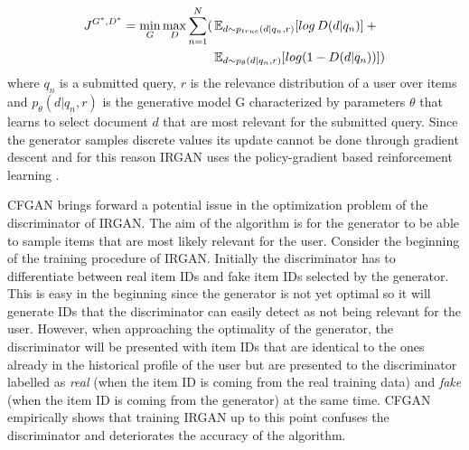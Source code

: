 \[
    \begin{split}
        J^{G^*,D^*} = \min_{G} \max_{D} \sum_{n=1}^N(
        & \operatorname{\mathbb{E}}_{d \sim{p_{true}(d|q_{n},r)}}[log \, D(d|q_{n})] \: + \: \\
        & \operatorname{\mathbb{E}}_{d \sim p_{\theta}(d|q_{n},r)}[log(1-D(d|q_{n}))])
    \end{split}
\]
where $q_{n}$ is a submitted query, $r$ is the relevance distribution of a user over items and $p_{\theta}(d|q_{n},r)$ is the generative model G characterized by parameters $\theta$ that learns to select document $d$ that are most relevant for the submitted query. Since the generator samples discrete values its update cannot be done through gradient descent and for this reason IRGAN uses the policy-gradient based reinforcement learning \cite{williams1992simple}.

CFGAN \cite{chae2018cfgan} brings forward a potential issue in the optimization problem of the discriminator of IRGAN. The aim of the algorithm is for the generator to be able to sample items that are most likely relevant for the user. Consider the beginning of the training procedure of IRGAN. Initially the discriminator has to differentiate between real item IDs and fake item IDs selected by the generator. This is easy in the beginning since the generator is not yet optimal so it will generate IDs that the discriminator can easily detect as not being relevant for the user. However, when approaching the optimality of the generator, the discriminator will be presented with item IDs that are identical to the ones already in the historical profile of the user but are presented to the discriminator labelled as \emph{real} (when the item ID is coming from the real training data) and \emph{fake} (when the item ID is coming from the generator) at the same time. CFGAN empirically shows that training IRGAN up to this point confuses the discriminator and deteriorates the accuracy of the algorithm.

